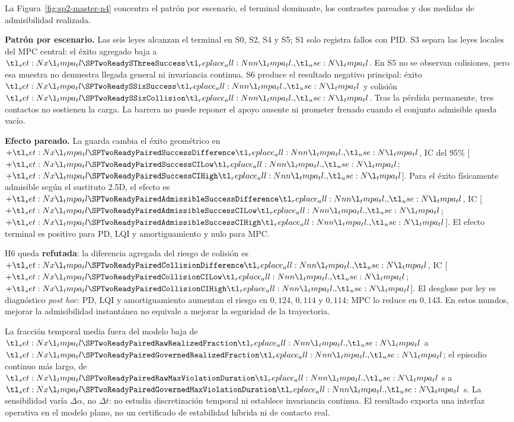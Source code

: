 La Figura~\ref{fig:sp2-master-n4} concentra el patrón por escenario, el terminal
dominante, los contrastes pareados y dos medidas de admisibilidad realizada.

\textbf{Patrón por escenario.} Las seis leyes alcanzan el terminal en S0, S2,
S4 y S5; S1 solo registra fallos con PID. S3 separa las leyes locales del MPC
central: el éxito agregado baja a
$\spdecimal{\SPTwoReadySThreeSuccess}$. En S5 no se observan colisiones, pero
esa muestra no demuestra llegada general ni invariancia continua. S6 produce el
resultado negativo principal: éxito
$\spdecimal{\SPTwoReadySSixSuccess}$ y colisión
$\spdecimal{\SPTwoReadySSixCollision}$. Tras la pérdida permanente, tres
contactos no sostienen la carga. La barrera no puede reponer el apoyo ausente ni
prometer frenado cuando el conjunto admisible queda vacío.

\textbf{Efecto pareado.} La guarda cambia el éxito geométrico en
$+\spdecimal{\SPTwoReadyPairedSuccessDifference}$, IC del 95\%
[$+\spdecimal{\SPTwoReadyPairedSuccessCILow}$;
$+\spdecimal{\SPTwoReadyPairedSuccessCIHigh}$]. Para el éxito físicamente
admisible según el sustituto 2.5D, el efecto es
$+\spdecimal{\SPTwoReadyPairedAdmissibleSuccessDifference}$, IC
[$+\spdecimal{\SPTwoReadyPairedAdmissibleSuccessCILow}$;
$+\spdecimal{\SPTwoReadyPairedAdmissibleSuccessCIHigh}$]. El efecto terminal es
positivo para PD, LQI y amortiguamiento y nulo para MPC.

H6 queda \textbf{refutada}: la diferencia agregada del riesgo de colisión es
$+\spdecimal{\SPTwoReadyPairedCollisionDifference}$, IC
[$+\spdecimal{\SPTwoReadyPairedCollisionCILow}$;
$+\spdecimal{\SPTwoReadyPairedCollisionCIHigh}$]. El desglose por ley es
diagnóstico \emph{post hoc}: PD, LQI y amortiguamiento aumentan el riesgo en
$0{,}124$, $0{,}114$ y $0{,}114$; MPC lo reduce en $0{,}143$. En estos mundos,
mejorar la admisibilidad instantánea no equivale a mejorar la seguridad de la
trayectoria.

La fracción temporal media fuera del modelo baja de
$\spdecimal{\SPTwoReadyPairedRawRealizedFraction}$ a
$\spdecimal{\SPTwoReadyPairedGovernedRealizedFraction}$; el episodio continuo
más largo, de $\spdecimal{\SPTwoReadyPairedRawMaxViolationDuration}$ s a
$\spdecimal{\SPTwoReadyPairedGovernedMaxViolationDuration}$ s. La sensibilidad
varía $\Delta\alpha$, no $\Delta t$: no estudia discretización temporal ni
establece invariancia continua. El resultado exporta una interfaz operativa en
el modelo plano, no un certificado de estabilidad híbrida ni de contacto real.
